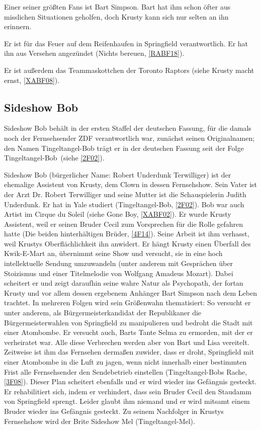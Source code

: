 Einer seiner größten Fans ist Bart Simpson. Bart hat ihm schon öfter aus miss\-lichen Situationen geholfen, doch Krusty kann sich nur selten an ihn erinnern.

Er ist für das Feuer auf dem Reifenhaufen in Springfield verantwortlich. Er hat ihn aus Versehen angezündet (\glqq Nichts bereuen\grqq , \ref{RABF18}).

Er ist außerdem das Teammaskottchen der Toronto Raptors (siehe \glqq Krusty macht ernst\grqq, \ref{XABF08}).

\subsection{Sideshow Bob}\label{SideshowBob}
Sideshow Bob behält in der ersten Staffel der deutschen Fassung, für die damals noch der Fernsehsender ZDF verantwortlich war, zunächst seinen Originalnamen; den Namen Tingeltangel-Bob trägt er in der deutschen Fassung seit der Folge \glqq Tingeltangel-Bob\grqq\ (siehe \ref{2F02}).

Sideshow Bob (bürgerlicher Name: Robert Underdunk Terwilliger) ist der ehemalige Assistent von Krusty, dem Clown in dessen Fernsehshow. Sein Vater ist der Arzt Dr. Robert Terwilliger und seine Mutter ist die Schauspielerin Judith Underdunk. Er hat in Yale studiert (\glqq Tingeltangel-Bob\grqq , \ref{2F02}). Bob war auch Artist im Cirque du Soleil (siehe \glqq Gone Boy\grqq, \ref{XABF02}). Er wurde Krusty Assistent, weil er seinen Bruder Cecil zum Vorsprechen für die Rolle gefahren hatte (\glqq Die beiden hinterhältigen Brüder\grqq , \ref{4F14}). Seine Arbeit ist ihm verhasst, weil Krustys Oberflächlichkeit ihn anwidert. Er hängt Krusty einen Überfall des Kwik-E-Mart an, übernimmt seine Show und versucht, sie in eine hoch intellektuelle Sendung umzuwandeln (unter anderem mit Gesprächen über Stoizismus und einer Titelmelodie von Wolfgang Amadeus Mozart). Dabei scheitert er und zeigt daraufhin seine wahre Natur als Psychopath, der fortan Krusty und vor allem dessen ergebenem Anhänger Bart Simpson nach dem Leben trachtet. In mehreren Folgen wird sein Größenwahn thematisiert: So versucht er unter anderem, als Bürgermeisterkandidat der Republikaner die Bürgermeisterwahlen von Springfield zu manipulieren und bedroht die Stadt mit einer Atombombe. Er versucht auch, Barts Tante Selma zu ermorden, mit der er verheiratet war. Alle diese Verbrechen werden aber von Bart und Lisa vereitelt. Zeitweise ist ihm das Fernsehen dermaßen zuwider, dass er droht, Springfield mit einer Atombombe in die Luft zu jagen, wenn nicht innerhalb einer bestimmten Frist alle Fernsehsender den Sendebetrieb einstellen (\glqq Tingeltangel-Bobs Rache\grqq , \ref{3F08}). Dieser Plan scheitert ebenfalls und er wird wieder ins Gefängnis gesteckt. Er rehabilitiert sich, indem er verhindert, dass sein Bruder Cecil den Staudamm von Springfield sprengt. Leider glaubt ihm niemand und er wird mitsamt einem Bruder wieder ins Gefängnis gesteckt. Zu seinem Nachfolger in Krustys Fernsehshow wird der Brite Sideshow Mel (Tingeltangel-Mel).

